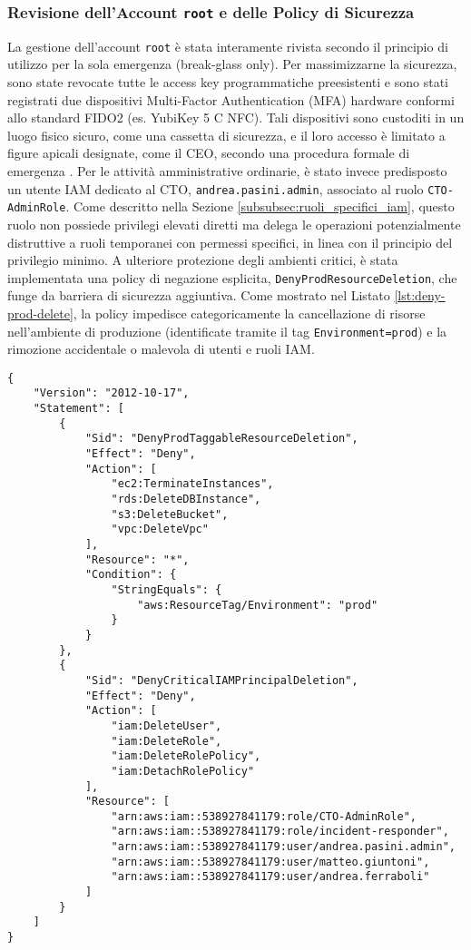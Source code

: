 \subsubsection{Revisione dell'Account \texttt{root} e delle Policy di Sicurezza}
La gestione dell'account \texttt{root} è stata interamente rivista secondo il principio di utilizzo per la sola emergenza (break-glass only). Per massimizzarne la sicurezza, sono state revocate tutte le access key programmatiche preesistenti e sono stati registrati due dispositivi Multi-Factor Authentication (MFA) hardware conformi allo standard FIDO2 (es. YubiKey 5 C NFC). Tali dispositivi sono custoditi in un luogo fisico sicuro, come una cassetta di sicurezza, e il loro accesso è limitato a figure apicali designate, come il CEO, secondo una procedura formale di emergenza \cite{saraswat:breakglass, clouddefense:mfa}.
Per le attività amministrative ordinarie, è stato invece predisposto un utente IAM dedicato al CTO, \texttt{andrea.pasini.admin}, associato al ruolo \texttt{CTO-AdminRole}. Come descritto nella Sezione \ref{subsubsec:ruoli_specifici_iam}, questo ruolo non possiede privilegi elevati diretti ma delega le operazioni potenzialmente distruttive a ruoli temporanei con permessi specifici, in linea con il principio del privilegio minimo.
A ulteriore protezione degli ambienti critici, è stata implementata una policy di negazione esplicita, \texttt{DenyProdResourceDeletion}, che funge da barriera di sicurezza aggiuntiva. Come mostrato nel Listato \ref{lst:deny-prod-delete}, la policy impedisce categoricamente la cancellazione di risorse nell'ambiente di produzione (identificate tramite il tag \texttt{Environment=prod}) e la rimozione accidentale o malevola di utenti e ruoli IAM.
\begin{lstlisting}[style=json, caption={Policy IAM per negare eliminazioni in produzione}, label=lst:deny-prod-delete]
  {
    "Version": "2012-10-17",
    "Statement": [
        {
            "Sid": "DenyProdTaggableResourceDeletion",
            "Effect": "Deny",
            "Action": [
                "ec2:TerminateInstances",
                "rds:DeleteDBInstance",
                "s3:DeleteBucket",
                "vpc:DeleteVpc"
            ],
            "Resource": "*",
            "Condition": {
                "StringEquals": {
                    "aws:ResourceTag/Environment": "prod"
                }
            }
        },
        {
            "Sid": "DenyCriticalIAMPrincipalDeletion",
            "Effect": "Deny",
            "Action": [
                "iam:DeleteUser",
                "iam:DeleteRole",
                "iam:DeleteRolePolicy",
                "iam:DetachRolePolicy"
            ],
            "Resource": [
                "arn:aws:iam::538927841179:role/CTO-AdminRole",
                "arn:aws:iam::538927841179:role/incident-responder",
                "arn:aws:iam::538927841179:user/andrea.pasini.admin",
                "arn:aws:iam::538927841179:user/matteo.giuntoni",
                "arn:aws:iam::538927841179:user/andrea.ferraboli"
            ]
        }
    ]
}
\end{lstlisting}

